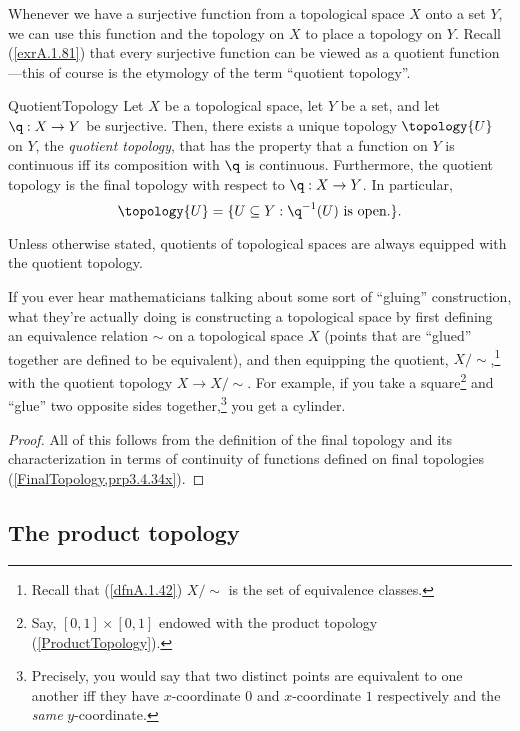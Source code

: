 Whenever we have a surjective function from a topological space $X$ onto a set $Y$, we can use this function and the topology on $X$ to place a topology on $Y$.  Recall (\cref{exrA.1.81}) that every surjective function can be viewed as a quotient function---this of course is the etymology of the term ``quotient topology''.
\begin{prp}{}{QuotientTopology}
Let $X$ be a topological space, let $Y$ be a set, and let $\q :X\rightarrow Y$ be surjective.  Then, there exists a unique topology $\topology{U}$ on $Y$, the \emph{quotient topology}, that has the property that a function on $Y$ is continuous iff its composition with $\q$ is continuous.  Furthermore, the quotient topology is the final topology with respect to $\q :X\rightarrow Y$.  In particular,
\begin{equation}
\topology{U}=\{ U\subseteq Y:\q ^{-1}(U)\text{ is open.}\} .
\end{equation}
\begin{rmk}
Unless otherwise stated, quotients of topological spaces are always equipped with the quotient topology.
\end{rmk}
\begin{rmk}
If you ever hear mathematicians talking about some sort of ``gluing'' construction, what they're actually doing is constructing a topological space by first defining an equivalence relation $\sim$ on a topological space $X$ (points that are ``glued'' together are defined to be equivalent), and then equipping the quotient, $X/\sim$,\footnote{Recall that (\cref{dfnA.1.42}) $X/\sim$ is the set of equivalence classes.} with the quotient topology $X\rightarrow X/\sim$.  For example, if you take a square\footnote{Say, $[0,1]\times [0,1]$ endowed with the product topology (\cref{ProductTopology}).} and ``glue'' two opposite sides together,\footnote{Precisely, you would say that two distinct points are equivalent to one another iff they have $x$-coordinate $0$ and $x$-coordinate $1$ respectively and the \emph{same} $y$-coordinate.} you get a cylinder.
\end{rmk}
\begin{proof}
All of this follows from the definition of the final topology and its characterization in terms of continuity of functions defined on final topologies (\cref{FinalTopology,prp3.4.34x}).
\end{proof}
\end{prp}

\subsection{The product topology}

